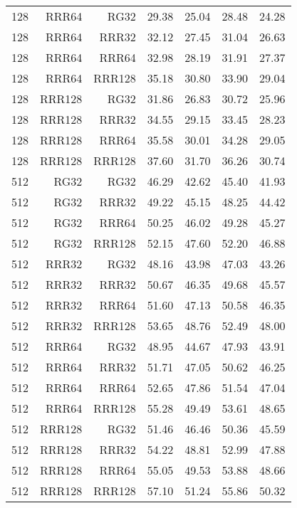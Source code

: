 \begin{table}
\begin{tabular}{|r|r|r|r|r|r|r|}
128 & RRR64 & RG32 & 29.38 & 25.04 & 28.48 & 24.28 \\
128 & RRR64 & RRR32 & 32.12 & 27.45 & 31.04 & 26.63 \\
128 & RRR64 & RRR64 & 32.98 & 28.19 & 31.91 & 27.37 \\
128 & RRR64 & RRR128 & 35.18 & 30.80 & 33.90 & 29.04 \\
128 & RRR128 & RG32 & 31.86 & 26.83 & 30.72 & 25.96 \\
128 & RRR128 & RRR32 & 34.55 & 29.15 & 33.45 & 28.23 \\
128 & RRR128 & RRR64 & 35.58 & 30.01 & 34.28 & 29.05 \\
128 & RRR128 & RRR128 & 37.60 & 31.70 & 36.26 & 30.74 \\
512 & RG32 & RG32 & 46.29 & 42.62 & 45.40 & 41.93 \\
512 & RG32 & RRR32 & 49.22 & 45.15 & 48.25 & 44.42 \\
512 & RG32 & RRR64 & 50.25 & 46.02 & 49.28 & 45.27 \\
512 & RG32 & RRR128 & 52.15 & 47.60 & 52.20 & 46.88 \\
512 & RRR32 & RG32 & 48.16 & 43.98 & 47.03 & 43.26 \\
512 & RRR32 & RRR32 & 50.67 & 46.35 & 49.68 & 45.57 \\
512 & RRR32 & RRR64 & 51.60 & 47.13 & 50.58 & 46.35 \\
512 & RRR32 & RRR128 & 53.65 & 48.76 & 52.49 & 48.00 \\
512 & RRR64 & RG32 & 48.95 & 44.67 & 47.93 & 43.91 \\
512 & RRR64 & RRR32 & 51.71 & 47.05 & 50.62 & 46.25 \\
512 & RRR64 & RRR64 & 52.65 & 47.86 & 51.54 & 47.04 \\
512 & RRR64 & RRR128 & 55.28 & 49.49 & 53.61 & 48.65 \\
512 & RRR128 & RG32 & 51.46 & 46.46 & 50.36 & 45.59 \\
512 & RRR128 & RRR32 & 54.22 & 48.81 & 52.99 & 47.88 \\
512 & RRR128 & RRR64 & 55.05 & 49.53 & 53.88 & 48.66 \\
512 & RRR128 & RRR128 & 57.10 & 51.24 & 55.86 & 50.32 \\
\hline
\end{tabular}
\end{table}